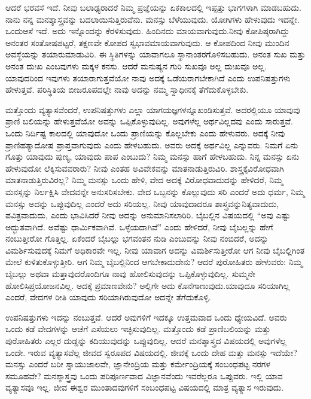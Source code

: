 ಆದರೆ ಭರವಸೆ ಇದೆ. ನೀವು ಬಲಾಢ್ಯರಾದರೆ ನಿಮ್ಮ ಪ್ರಜ್ಞೆಯನ್ನು ಏಕಕಾಲದಲ್ಲಿ ಇಪ್ಪತ್ತು ಭಾಗಗಳಾಗಿ ಮಾಡಬಹುದು. ನಾನು ನನ್ನ ಮನಶ್ಶಾಸ್ತ್ರವನ್ನು ಬದಲಾಯಿಸುತ್ತಿರುವೆನು. ಮನಸ್ಸು ಬೆಳೆಯುವುದು. ಯೋಗಿಗಳು ಹೇಳುವುದು ಇದನ್ನೇ. ಒಂದು\break ಆಸೆ ಇದೆ. ಅದು ಇನ್ನೊಂದನ್ನು ಕೆರಳಿಸುವುದು. ಹಿಂದಿನದು ಮಾಯವಾಗುವುದು.\break ನೀವು ಕೋಪಿಷ್ಠರಾಗಿದ್ದು ಅನಂತರ ಸಂತೋಷಪಟ್ಟರೆ, ತಕ್ಷಣವೇ ಕೋಪದ ಸ್ವಭಾವ\break ಮಾಯವಾಗುವುದು. ಆ ಕೋಪದಿಂದ ನೀವು ಮುಂದಿನ ಅವಸ್ಥೆಯನ್ನು ತಯಾರು\break ಮಾಡುವಿರಿ. ಈ ಸ್ಥಿತಿಗಳನ್ನು ಯಾವಾಗಲೂ ಸ್ಥಾನಾಂತರಗೊಳಿಸಬಹುದು. ಅನಂತ ಸುಖ ಮತ್ತು ಅನಂತ ದುಃಖ ಎಂಬವುಗಳು ಮಕ್ಕಳ ಕನಸು. ಆದರೆ ಮನುಷ್ಯನ ಗುರಿ ಸುಖವೂ ಅಲ್ಲ ದುಃಖವೂ ಅಲ್ಲ. ಯಾವುದರಿಂದ ಇವುಗಳು ತಯಾರಾಗುತ್ತವೆಯೋ ನಾವು ಅದಕ್ಕೆ ಒಡೆಯರಾಗಬೇಕಾಗಿದೆ ಎಂದು ಉಪನಿಷತ್ತುಗಳು ಹೇಳುತ್ತವೆ. ಪರಿಸ್ಥಿತಿಯ ಬೀಜರೂಪದಲ್ಲೇ ನಾವು ಅದನ್ನು ನಮ್ಮ ಸ್ವಾಧೀನಕ್ಕೆ ತೆಗೆದುಕೊಳ್ಳಬೇಕು.

ಮತ್ತೊಂದು ವ್ಯತ್ಯಾಸವೆಂದರೆ, ಉಪನಿಷತ್ತುಗಳು ಎಲ್ಲಾ ಯಾಗಯಜ್ಞಗಳನ್ನೂ\break ಖಂಡಿಸುತ್ತವೆ. ಅದರಲ್ಲಿಯೂ ಯಾವುವು ಪ್ರಾಣಿ ಬಲಿಯನ್ನು ಹೇಳುತ್ತವೆಯೋ ಅವನ್ನು ಒಪ್ಪಿಕೊಳ್ಳುವುದಿಲ್ಲ. ಅವುಗಳೆಲ್ಲ ಅರ್ಥವಿಲ್ಲದವು ಎಂದು ಸಾರುತ್ತವೆ. ಒಂದು ನಿರ್ದಿಷ್ಟ ಕಾಲದಲ್ಲಿ ಯಾವುದೋ ಒಂದು ಪ್ರಾಣಿಯನ್ನು ಕೊಲ್ಲಬೇಕು ಎಂದು ಹೇಳುವರು. ಅದಕ್ಕೆ ನೀವು ಪ್ರಾಣಿಹತ್ಯಾದೋಷ ಪ್ರಾಪ್ತವಾಗುವುದು ಎಂದು ಹೇಳಬಹುದು. ಅವರು ಅದಕ್ಕೆ ಅರ್ಥವಿಲ್ಲ ಎನ್ನುವರು. ನಿಮಗೆ ಏನು ಗೊತ್ತು ಯಾವುದು ಪುಣ್ಯ, ಯಾವುದು ಪಾಪ ಎಂಬುದು? ನಿಮ್ಮ ಮನಸ್ಸು ಹಾಗೆ ಹೇಳಬಹುದು. ನಿನ್ನ ಮನಸ್ಸು ಏನು ಹೇಳುವುದೋ ಲೆಕ್ಕಿಸುವವರಾರು? ನೀವು ಎಂತಹ ಅವಿವೇಕವನ್ನು ಮಾತನಾಡುತ್ತಿರುವಿರಿ. ಶಾಸ್ತ್ರಕ್ಕೆ\break ವಿರೋಧವಾಗಿ ಮಾತನಾಡುತ್ತಿರುವಿರಲ್ಲ? ನಿಮ್ಮ ಮನಸ್ಸು ಒಂದು ಹೇಳಿ, ವೇದ ಅದಕ್ಕೆ ವಿರೋಧವಾದುದನ್ನು ಹೇಳಿದರೆ, ನಿಮ್ಮ ಮನಸ್ಸನ್ನು ನಿರ್ಲಕ್ಷಿಸಿ ವೇದವನ್ನೇ ಅನುಸರಿಸಬೇಕು. ವೇದ ಒಬ್ಬನನ್ನು ಕೊಲ್ಲುವುದು ಸರಿ ಎಂದರೆ ಅದು ಧರ್ಮ, ನಿಮ್ಮ ಮನಸ್ಸು ಅದನ್ನು ಒಪ್ಪುವುದಿಲ್ಲ ಎಂದರೆ ಅದು ಸರಿಯಲ್ಲ. ನೀವು ಯಾವುದಾದರೂ ಶಾಸ್ತ್ರವನ್ನು\break ನಿತ್ಯವಾದುದು, ಪವಿತ್ರವಾದುದು, ಎಂದು ಭಾವಿಸಿದರೆ ನೀವು ಅದನ್ನು ಅನುಮಾನಿಸಲಾರಿರಿ. ಬೈಬಲ್ಲಿನ ವಿಷಯದಲ್ಲಿ “ಅವು ಎಷ್ಟು ಅದ್ಭುತವಾಗಿದೆ. ಅವೆಷ್ಟು ಧಾರ್ಮಿಕವಾಗಿವೆ. ಒಳ್ಳೆಯದಾಗಿವೆ” ಎಂದು ಹೇಳಿದರೆ, ನೀವು ಬೈಬಲ್ಲನ್ನು ಹೇಗೆ ನಂಬುತ್ತೀರೋ ಗೊತ್ತಿಲ್ಲ. ಏಕೆಂದರೆ ಬೈಬಲ್ಲು ಭಗವಂತನ ನುಡಿ ಎಂಬುದನ್ನು ನೀವು ನಂಬಿದರೆ, ಅದನ್ನು ವಿಮರ್ಶಿಸು\-ವುದಕ್ಕೆ ನಿಮಗೆ ಅಧಿಕಾರವೇ ಇಲ್ಲ. ನೀವು ಯಾವಾಗ ಅದನ್ನು ವಿಮರ್ಶಿಸುತ್ತೀರೋ ಆಗ ನೀವು ಬೈಬಲ್ಲಿಗಿಂತ ಮೇಲೆ ಕುಳಿತುಕೊಳ್ಳುತ್ತೀರಿ. ಆಗ ನಿಮ್ಮ ಬೈಬಲ್ಲಿನಿಂದ ಆಗಬೇಕಾದು\-ದೇನು? ಆದರೆ ಪುರೋಹಿತರು ಹೇಳುವರು: ನಿಮ್ಮ ಬೈಬಲ್ಲು ಅಥವಾ ಮತ್ತಾವುದರೊಂದಿಗೂ ನಾವು ಹೋಲಿಸುವುದನ್ನು ಒಪ್ಪಿಕೊಳ್ಳುವುದಿಲ್ಲ. ಸುಮ್ಮನೇ ಹೋಲಿಸಿ\break ಪ್ರಯೋಜನವಿಲ್ಲ. ಅದಕ್ಕೆ ಪ್ರಮಾಣವೇನು? ಅಲ್ಲಿಗೇ ಅದು ಕೊನೆಗಾಣುವುದು.\break ಯಾವುದೂ ಸರಿಯಾಗಿಲ್ಲ ಎಂದರೆ, ವೇದಗಳ ರೀತಿ ಯಾವುದು ಸರಿಯಾಗಿರುವುದೋ ಅದನ್ನೇ ತೆಗೆದುಕೊಳ್ಳಿ.

ಉಪನಿಷತ್ತುಗಳು ಇದನ್ನು ನಂಬುತ್ತವೆ. ಆದರೆ ಅವುಗಳಿಗೆ ಇದಕ್ಕೂ ಉತ್ತಮವಾದ ಒಂದು ಧ್ಯೇಯವಿದೆ. ಅವರು ಒಂದು ಕಡೆ ವೇದಗಳನ್ನು ಆಚೆಗೆ ಎಸೆಯಲು ಇಚ್ಛಿಸುವು\-ದಿಲ್ಲ. ಮತ್ತೊಂದು ಕಡೆ ಪ್ರಾಣಿಬಲಿಯನ್ನು ಮತ್ತು ಪುರೋಹಿತರು ಎಲ್ಲರ ದುಡ್ಡನ್ನು ಕದಿಯುವುದನ್ನು ಒಪ್ಪುವುದಿಲ್ಲ. ಆದರೆ ಮನಶ್ಶಾಸ್ತ್ರದ ವಿಷಯದಲ್ಲಿ ಅವುಗಳೆಲ್ಲ ಒಂದೇ. ಇರುವ ವ್ಯತ್ಯಾಸವೆಲ್ಲ ಜೀವದ ಸ್ವರೂಪದ ವಿಷಯದಲ್ಲಿ. ಜೀವಕ್ಕೆ ಒಂದು ದೇಹ ಮತ್ತು ಮನಸ್ಸು ಇದೆಯೇ? ಮನಸ್ಸು ಎಂದರೆ ಬರೀ ಸ್ನಾಯುಜಾಲವೇ, ಜ್ಞಾನೇಂದ್ರಿಯ ಮತ್ತು ಕರ್ಮೇಂದ್ರಿಯಕ್ಕೆ ಸಂಬಂಧಪಟ್ಟ ನರಗಳ ಸಮೂಹವೇ? ಮನಶ್ಶಾಸ್ತ್ರವು ಒಂದು ಪರಿಪೂರ್ಣ\-ವಾದ ವಿಜ್ಞಾನವೆಂದು ಇವರೆಲ್ಲರೂ ಒಪ್ಪುವರು. ಇಲ್ಲಿ ಯಾವ ವ್ಯತ್ಯಾಸವೂ ಇಲ್ಲ. ಜೀವ ಈಶ್ವರ ಮುಂತಾದವುಗಳಿಗೆ ಸಂಬಂಧಪಟ್ಟ ವಿಷಯದಲ್ಲಿ ಮಾತ್ರ ವ್ಯತ್ಯಾಸ ಇರುವುದು.

